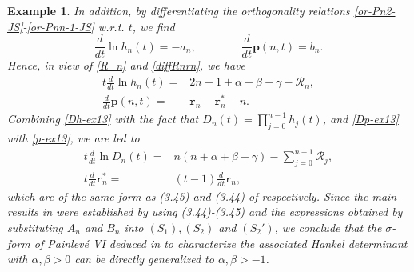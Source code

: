 \documentclass[12pt,a4paper]{article}    %
\newtheorem{exm}{Example}
\numberwithin{equation}{section}
\begin{document}
\begin{exm}
In addition, by differentiating the orthogonality relations \eqref{or-Pn2-JS}-\eqref{or-Pnn-1-JS} w.r.t. $t$, we find
\[\frac{d}{dt}\ln h_n(t)=-a_n,\qquad\qquad \frac{d}{dt}\mathbf{p}(n,t)=b_n.\]
Hence, in view of \eqref{R_n} and \eqref{diffRnrn}, we have
\begin{align}
t\frac{d}{dt}\ln h_n(t)=&2n+1+\alpha+\beta+\gamma-\mathcal{R}_n,\label{Dh-ex13}\\ \frac{d}{dt}\mathbf{p}(n,t)=&\texttt{r}_n-\texttt{r}_n^*-n.\label{Dp-ex13}
\end{align}
Combining \eqref{Dh-ex13} with the fact that $D_n(t)=\prod_{j=0}^{n-1}h_j(t)$, and \eqref{Dp-ex13} with \eqref{p-ex13}, we are led to
\begin{align}
t\frac{d}{dt}\ln D_n(t)=&n(n+\alpha+\beta+\gamma)-\sum_{j=0}^{n-1}\mathcal{R}_j,\\
t\frac{d}{dt}\texttt{r}_n^*=&(t-1)\frac{d}{dt}\texttt{r}_n,
\end{align}
which are of the same form as (3.45) and (3.44) of \cite{DZ10} respectively.
Since the main results in \cite{DZ10} were established by using (3.44)-(3.45) and the expressions obtained by substituting $A_n$ and $B_n$ into $(S_1), (S_2)$ and $(S_2')$, we conclude that the $\sigma$-form of Painlev\'{e} VI deduced in \cite{DZ10} to characterize the associated Hankel determinant with $\alpha,\beta>0$ can be directly generalized to $\alpha,\beta>-1$.

\end{exm}
\end{document}
